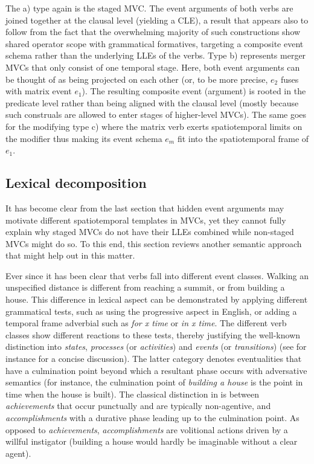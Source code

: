 The a) type again is the staged MVC. The event arguments of both verbs are joined together at the clausal level (yielding a CLE), a result that appears also to follow from the fact that the overwhelming majority of such constructions show shared operator scope with grammatical formatives, targeting a composite event schema rather than the underlying LLEs of the verbs. Type b) represents merger MVCs that only consist of one temporal stage. Here, both event arguments can be thought of as being projected on each other (or, to be more precise, $e_2$ fuses with matrix event $e_1$). The resulting composite event (argument) is rooted in the predicate level rather than being aligned with the clausal level (mostly because such construals are allowed to enter stages of higher-level MVCs). The same goes for the modifying type c) where the matrix verb exerts spatiotemporal limits on the modifier thus making its event schema $e_m$ fit into the spatiotemporal frame of $e_1$.

\subsection{Lexical decomposition} \label{sec:decomposition}

It has become clear from the last section that hidden event arguments may motivate different spatiotemporal templates in MVCs, yet they cannot fully explain why staged MVCs do not have their LLEs combined while non-staged MVCs might do so. To this end, this section reviews another semantic approach that might help out in this matter.

Ever since \citet{vendler1957verbs} it has been clear that verbs fall into different event classes. Walking an unspecified distance is different from reaching a summit, or from building a house. This difference in lexical aspect can be demonstrated by applying different grammatical tests, such as using the progressive aspect in English, or adding a temporal frame adverbial such as \textit{for x time} or \textit{in x time}. The different verb classes show different reactions to these tests, thereby justifying the well-known distinction into \textit{states}, \textit{processes} (or \textit{activities}) and \textit{events} (or \textit{transitions}) (see for instance \citealt{pustejovsky1991syntax} for a concise discussion). The latter category denotes eventualities that have a culmination point beyond which a resultant phase occurs with adversative semantics (for instance, the culmination point of \textit{building a house} is the point in time when the house is built). The classical distinction in \citet{vendler1957verbs} is between \textit{achievements} that occur punctually and are typically non-agentive, and \textit{accomplishments} with a durative phase leading up to the culmination point. As opposed to \textit{achievements}, \textit{accomplishments} are volitional actions driven by a willful instigator (building a house would hardly be imaginable without a clear agent).


